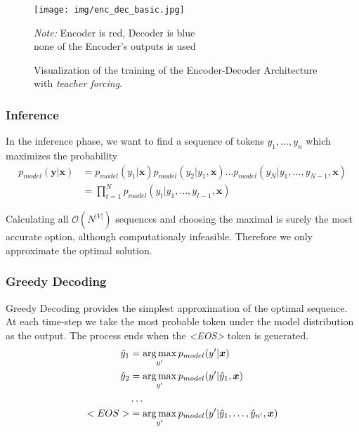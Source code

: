\begin{figure}[!h]
    \centering
    \texttt{[image: img/enc\_dec\_basic.jpg]}

    \footnotesize{\textit{Note:} Encoder is red, Decoder is blue \\ }
    \footnotesize{none of the Encoder's outputs is used}
    \caption{\centering Visualization of the training of the Encoder-Decoder Architecture with \emph{teacher forcing}.} \label{figure:visualization_ED}
\end{figure}

\subsubsection{Inference}

In the inference phase, we want to find a sequence of tokens $y_1,\dots,y_n$ which maximizes the probability
\begin{align}
    p_{model}(\boldsymbol{y} | \boldsymbol{x}) &= p_{model}(y_1|\boldsymbol{x})p_{model}(y_2|y_1, \boldsymbol{x})\dots p_{model}(y_N|y_1,\dots,y_{N-1}, \boldsymbol{x})\\
    &= \prod_{t=1}^N{p_{model}(y_t|y_1,\dots,y_{t-1}, \boldsymbol{x})}
\end{align}

Calculating all $\mathcal{O}(N^{|V|})$ sequences and choosing the maximal is surely the most accurate option, although computationaly infeasible. Therefore we only approximate the optimal solution.

\subsubsection{Greedy Decoding}

Greedy Decoding provides the simplest approximation of the optimal sequence. At each time-step we take the most probable token under the model distribution as the output. The process ends when the \emph{\textless EOS\textgreater} token is generated.
\begin{align*}
    \hat{y}_1 &= \operatorname*{arg\,max}_{y'}{p_{model}(y' | \boldsymbol{x})} \\
    \hat{y}_2 &= \operatorname*{arg\,max}_{y'}{p_{model}(y' | \hat{y}_1, \boldsymbol{x})} \\
    &\dots \\
    <EOS> &= \operatorname*{arg\,max}_{y'}{p_{model}(y' | \hat{y}_1,\dots,\hat{y}_{n'}, \boldsymbol{x})}
\end{align*}

